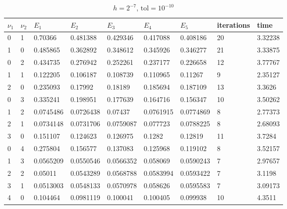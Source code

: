 \documentclass{article} %
\theoremstyle{plain}
\numberwithin{equation}{section} %
\numberwithin{figure}{section} %
\numberwithin{table}{section} %
\begin{document}
\begin{table}[ht!]
\centering
\begin{tabular}{||l|l|||l|l|l|l|l||l||l||}
\hline\hline
   $\nu_1$ &   $\nu_2$ &       $E_1$ &       $E_2$ &       $E_3$ &       $E_4$ &      $E_5$ &   iterations &     time \\
\hline\hline
      0 &      1 & 0.70366   & 0.481388  & 0.429346  & 0.417088  & 0.408186  &    {\color{red}20} & {\color{red}3.32238} \\\hline
      1 &      0 & {\color{red}0.485865}  & {\color{red}0.362892}  & {\color{red}0.348612}  & {\color{red}0.345926}  & {\color{red}0.346277}  &    21 & 3.33875 \\\hline\hline\hline

      0 &      2 & 0.434735  & 0.276942  & 0.252261  & 0.237177  & 0.226658  &    12 & 3.77767 \\\hline
      1 &      1 & {\color{red}0.122205}  & {\color{red}0.106187}  & {\color{red}0.108739}  & {\color{red}0.110965}  & {\color{red}0.11267}   &     {\color{red}9} & {\color{red}2.35127} \\\hline
      2 &      0 & 0.235093  & 0.17992   & 0.18189   & 0.185694  & 0.187109  &    13 & 3.3626  \\\hline\hline\hline

      0 &      3 & 0.335241  & 0.198951  & 0.177639  & 0.164716  & 0.156347  &    10 & 3.50262 \\\hline
      1 &      2 & 0.0745486 & {\color{red}0.0726438} & {\color{red}0.07437}   & {\color{red}0.0761915} & {\color{red}0.0774869} &     {\color{red}8} & 2.77373 \\\hline
      2 &      1 & {\color{red}0.0734148} & 0.0731706 & 0.0759087 & 0.077723  & 0.0788225 &     {\color{red}8} & {\color{red}2.68093} \\\hline
      3 &      0 & 0.151107  & 0.124623  & 0.126975  & 0.1282    & 0.12819   &    11 & 3.7284  \\\hline\hline\hline

      0 &      4 & 0.275804  & 0.156577  & 0.137083  & 0.125968  & 0.119102  &     8 & 3.52157 \\\hline
      1 &      3 & 0.0565209 & 0.0550546 & {\color{red}0.0566352} & {\color{red}0.058069}  & {\color{red}0.0590243} &     {\color{red}7} & {\color{red}2.97657} \\\hline
      2 &      2 & {\color{red}0.05011}   & {\color{red}0.0543289} & 0.0568788 & 0.0583994 & 0.0593422 &     {\color{red}7} & 3.1198  \\\hline
      3 &      1 & 0.0513003 & 0.0548133 & 0.0570978 & 0.058626  & 0.0595583 &     {\color{red}7} & 3.09173 \\\hline
      4 &      0 & 0.104464  & 0.0981119 & 0.100041  & 0.100405  & 0.099938  &    10 & 4.3511  \\\hline\hline\hline
\end{tabular}
\caption*{$h=2^{-7}$, $\text{tol}=10^{-10}$}
\end{table}
\end{document}
